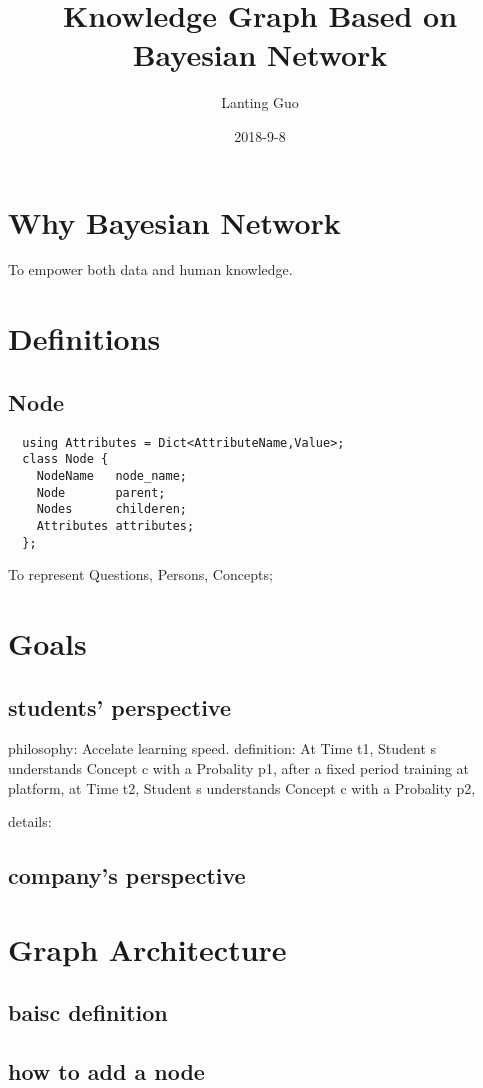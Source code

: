 \documentclass{article}
\title{Knowledge Graph Based on Bayesian Network}
\date{2018-9-8}
\author{Lanting Guo}
\begin{document}
\maketitle
\newpage
\tableofcontents
\newpage
{}

\section{Why Bayesian Network}
To empower both data and human knowledge.
\section{Definitions}
\subsection{Node}
\begin{lstlisting}
  using Attributes = Dict<AttributeName,Value>;
  class Node {
    NodeName   node_name;
    Node       parent;
    Nodes      childeren;
    Attributes attributes;
  };
\end{lstlisting}
To represent Questions, Persons, Concepts;

\section{Goals}
\subsection{students' perspective}
philosophy: Accelate learning speed.
definition: At Time t1, Student s understands Concept c with a Probality p1, after a fixed period training at platform,
            at Time t2, Student s understands Concept c with a Probality p2,

details: 
\subsection{company's perspective}
\section{Graph Architecture}
\subsection{baisc definition}
\subsection{how to add a node}
\end{document}
